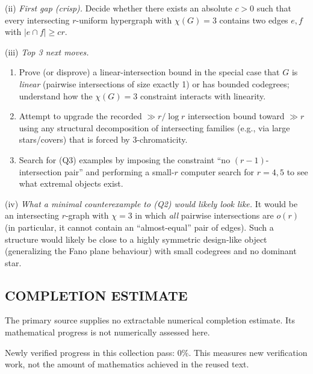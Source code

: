(ii) \emph{First gap (crisp).} Decide whether there exists an absolute $c>0$ such that every intersecting $r$-uniform hypergraph with $\chi(G)=3$ contains two edges $e,f$ with $|e\cap f|\ge c r$.

(iii) \emph{Top 3 next moves.}
\begin{enumerate}
\item Prove (or disprove) a linear-intersection bound in the special case that $G$ is \emph{linear} (pairwise intersections of size exactly 1) or has bounded codegrees; understand how the $\chi(G)=3$ constraint interacts with linearity.
\item Attempt to upgrade the recorded $\gg r/\log r$ intersection bound toward $\gg r$ using any structural decomposition of intersecting families (e.g., via large stars/covers) that is forced by 3-chromaticity.
\item Search for (Q3) examples by imposing the constraint ``no $(r-1)$-intersection pair'' and performing a small-$r$ computer search for $r=4,5$ to see what extremal objects exist.
\end{enumerate}

(iv) \emph{What a minimal counterexample to (Q2) would likely look like.} It would be an intersecting $r$-graph with $\chi=3$ in which \emph{all} pairwise intersections are $o(r)$ (in particular, it cannot contain an ``almost-equal'' pair of edges). Such a structure would likely be close to a highly symmetric design-like object (generalizing the Fano plane behaviour) with small codegrees and no dominant star.




\subsection*{COMPLETION ESTIMATE}
The primary source supplies no extractable numerical completion estimate. Its mathematical progress is not numerically assessed here.

Newly verified progress in this collection pass: $0\%$. This measures new verification work, not the amount of mathematics achieved in the reused text.

